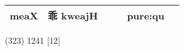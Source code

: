 \documentclass[14pt,a4paper]{scrartcl}
\begin{document}
\begin{longtable}[c]{@{}llllll@{}}
\begin{minipage}[t]{0.14\columnwidth}
meaX
\strut\end{minipage} &
\begin{minipage}[t]{0.14\columnwidth}\raggedright\strut
乖 kweajH
\strut\end{minipage} &
\begin{minipage}[t]{0.14\columnwidth}\raggedright\strut
\strut\end{minipage} &
\begin{minipage}[t]{0.14\columnwidth}\raggedright\strut
\strut\end{minipage} &
\begin{minipage}[t]{0.14\columnwidth}\raggedright\strut
pure:qu
\strut\end{minipage}\tabularnewline
\bottomrule
\end{longtable}

(323) 1241 {[}12{]}
\end{document}
